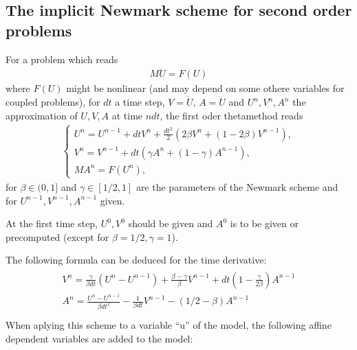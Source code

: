 \documentclass[a4paper,11pt,english]{sphinxmanual}
\begin{document}
\subsection{The implicit Newmark scheme for second order problems}
\label{\detokenize{userdoc/model_time_integration:the-implicit-newmark-scheme-for-second-order-problems}}
For a problem which reads
\begin{equation*}
\begin{split}M\ddot{U} = F(U)\end{split}
\end{equation*}
where \(F(U)\) might be nonlinear (and may depend on some othere variables for coupled problems), for \(dt\) a time step, \(V = \dot{U}\), \(A = \ddot{U}\) and \(U^n, V^n, A^n\) the approximation of \(U, V, A\) at time \(ndt\), the first oder theta\sphinxhyphen{}method reads
\begin{equation*}
\begin{split}\left\{ \begin{array}{l}
U^n = U^{n-1} + dtV^n + \frac{dt^2}{2}(2\beta V^n + (1-2\beta) V^{n-1}), \\
V^n = V^{n-1} + dt(\gamma A^n + (1-\gamma) A^{n-1}), \\
MA^n = F(U^n),
\end{array}\right.\end{split}
\end{equation*}
for \(\beta \in (0, 1]\) and \(\gamma \in [1/2, 1]\) are the parameters of the Newmark scheme and for \(U^{n-1}, V^{n-1}, A^{n-1}\) given.

At the first time step, \(U^0, V^0\) should be given and \(A^0\) is to be given or pre\sphinxhyphen{}computed (except for \(\beta = 1/2, \gamma = 1\)).

The following formula can be deduced for the time derivative:
\begin{align*}\!\begin{aligned}
V^n = \frac{\gamma}{\beta dt}(U^n - U^{n-1}) + \frac{\beta-\gamma}{\beta}V^{n-1} + dt(1-\frac{\gamma}{2\beta})A^{n-1}\\
A^n = \frac{U^n - U^{n-1}}{\beta dt^2} - \frac{1}{\beta dt}V^{n-1} - (1/2-\beta)A^{n-1}\\
\end{aligned}\end{align*}
When aplying this scheme to a variable “u” of the model, the following affine dependent variables are added to the model:

\begin{sphinxVerbatim}[commandchars=\\\{\}]
 
\end{sphinxVerbatim}
\end{document}
